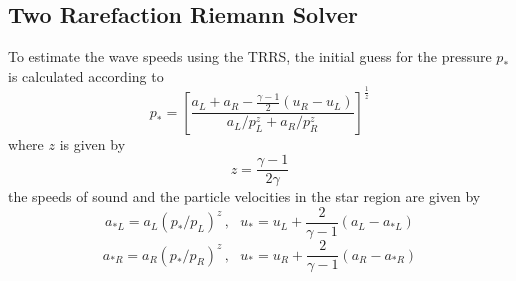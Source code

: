 \subsection{Two Rarefaction Riemann Solver}\label{sect:TRRS}
To estimate the wave speeds using the TRRS, the initial guess for the pressure $p_*$ is calculated according to
\begin{equation}
	p_* = \left[\frac{a_L + a_R - \frac{\gamma - 1}{2} \left(u_R - u_L\right)}{a_L / p_L^z + a_R / p_R^z}\right]^{\frac{1}{z}}
\end{equation}
where $z$ is given by
\begin{equation}
	z = \frac{\gamma - 1}{2 \gamma}
\end{equation}
the speeds of sound and the particle velocities in the star region are given by
\begin{equation}
	a_{*L} = a_L \left(p_* / p_L\right)^z \, , \,\,\,\, u_* = u_L + \frac{2}{\gamma - 1} \left(a_L - a_{*L}\right)
\end{equation}
\begin{equation}
	a_{*R} = a_R \left(p_* / p_R\right)^z \, , \,\,\,\, u_* = u_R + \frac{2}{\gamma - 1} \left(a_R - a_{*R}\right)
\end{equation}
